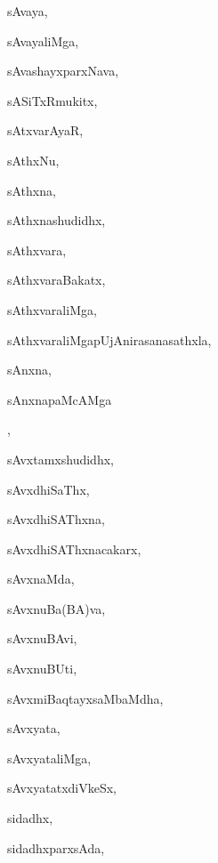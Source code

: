 \begin{multicols}{3}
{\noindent
{sAvaya}, \pageref{sAvaya}

\noindent
{sAvayaliMga}, \pageref{sAvayaliMga}

\noindent
{sAvashayxparxNava}, \pageref{sAvashayxparxNava}

\noindent
{sASiTxRmukitx}, \pageref{sASiTxRmukitx}

\noindent
{sAtxvarAyaR}, \pageref{sAtxvarAyaR}

\noindent
{sAthxNu}, \pageref{sAthxNu}

\noindent
{sAthxna}, \pageref{sAthxna}

\noindent
{sAthxnashudidhx}, \pageref{sAthxnashudidhx}

\noindent
{sAthxvara}, \pageref{sAthxvara}

\noindent
{sAthxvaraBakatx}, \pageref{sAthxvaraBakatx}

\noindent
{sAthxvaraliMga}, \pageref{sAthxvaraliMga}

\noindent
{sAthxvaraliMgapUjAnirasanasathxla}, \pageref{sAthxvaraliMgapUjAnirasanasathxla}

\noindent
{sAnxna}, \pageref{sAnxna}

\noindent
{sAnxnapaMcAMga}

\noindent
{}, \pageref{sAnxnapaMcAMgapaMcAMgasAnxna}

\noindent
{sAvxtamxshudidhx}, \pageref{sAvxtamxshudidhx}

\noindent
{sAvxdhiSaThx}, \pageref{sAvxdhiSaThx}

\noindent
{sAvxdhiSAThxna}, \pageref{sAvxdhiSAThxna}

\noindent
{sAvxdhiSAThxnacakarx}, \pageref{sAvxdhiSAThxnacakarx}

\noindent
{sAvxnaMda}, \pageref{sAvxnaMda}

\noindent
{sAvxnuBa(BA)va}, \pageref{sAvxnuBaBAva}

\noindent
{sAvxnuBAvi}, \pageref{sAvxnuBAvi}

\noindent
{sAvxnuBUti}, \pageref{sAvxnuBUti}

\noindent
{sAvxmiBaqtayxsaMbaMdha}, \pageref{sAvxmiBaqtayxsaMbaMdha}

\noindent
{sAvxyata}, \pageref{sAvxyata}

\noindent
{sAvxyataliMga}, \pageref{sAvxyataliMga}

\noindent
{sAvxyatatxdiVkeSx}, \pageref{sAvxyatatxdiVkeSx}

\noindent
{sidadhx}, \pageref{sidadhx}

\noindent
{sidadhxparxsAda}, \pageref{sidadhxparxsAda}

}
\end{multicols}
